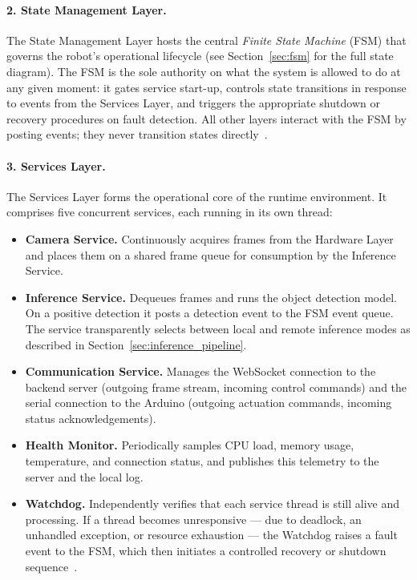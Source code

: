 \paragraph{2. State Management Layer.}
The State Management Layer hosts the central \emph{Finite State
Machine} (FSM) that governs the robot's operational lifecycle (see
Section~\ref{sec:fsm} for the full state diagram). The FSM is the
sole authority on what the system is allowed to do at any given
moment: it gates service start-up, controls state transitions in
response to events from the Services Layer, and triggers the
appropriate shutdown or recovery procedures on fault detection. All
other layers interact with the FSM by posting events; they never
transition states directly~\cite{hopcroft2006automata}.
 
\paragraph{3. Services Layer.}
The Services Layer forms the operational core of the runtime
environment. It comprises five concurrent services, each running in
its own thread:
 
\begin{itemize}
    \item \textbf{Camera Service.} Continuously acquires frames from
          the Hardware Layer and places them on a shared frame queue
          for consumption by the Inference Service.
 
    \item \textbf{Inference Service.} Dequeues frames and runs the
          object detection model. On a positive detection it posts
          a detection event to the FSM event queue. The service
          transparently selects between local and remote inference
          modes as described in Section~\ref{sec:inference_pipeline}.
 
    \item \textbf{Communication Service.} Manages the WebSocket
          connection to the backend server (outgoing frame stream,
          incoming control commands) and the serial connection to the
          Arduino (outgoing actuation commands, incoming status
          acknowledgements).
 
    \item \textbf{Health Monitor.} Periodically samples CPU load,
          memory usage, temperature, and connection status, and
          publishes this telemetry to the server and the local log.
 
    \item \textbf{Watchdog.} Independently verifies that each service
          thread is still alive and processing. If a thread becomes
          unresponsive — due to deadlock, an unhandled exception, or
          resource exhaustion — the Watchdog raises a fault event
          to the FSM, which then initiates a controlled recovery or
          shutdown sequence~\cite{kopetz2011real}.
\end{itemize}
 
